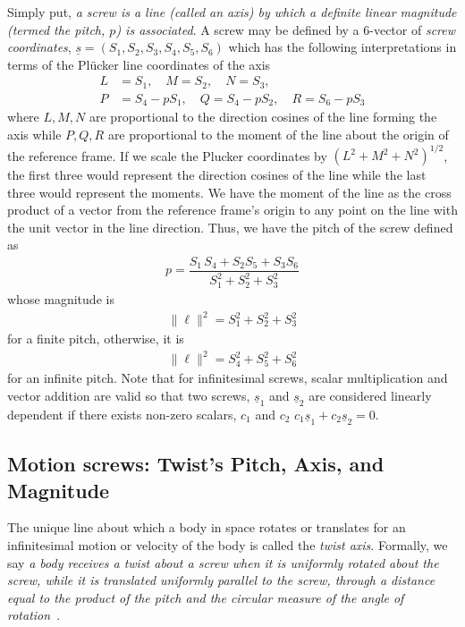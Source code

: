 Simply put, \textit{a screw is a line (called an axis) by which a definite linear magnitude (termed the pitch, $p$) is associated}.
A screw may be defined by a 6-vector of \textit{screw coordinates}, $\underline{s}=(S_1, S_2, S_3,S_4, S_5, S_6)$ which has the following interpretations in terms of the Pl\"ucker line coordinates of the axis
%
\begin{subequations}
	\begin{align}
	L &= S_1, \quad M = S_2, \quad N=S_3,   \label{eq:plucker_line} \\ 
	P &= S_4 - pS_1, \quad Q = S_4 - pS_2, \quad R = S_6 - pS_3
	\label{eq:plucker_mom}
	\end{align}
\end{subequations}
%
where $L, M, N$ are proportional to the direction cosines of the line forming the axis while $P, Q, R$ are proportional to the moment of the line about the origin of the reference frame. If we scale the Plucker coordinates by $(L^2 + M^2 + N^2)^{1/2}$, the first three would represent the direction cosines of the line while the last three would represent the moments. We have the moment of the line as the cross product of a vector from the reference frame's origin to any point on the line with the unit vector in the line direction. Thus, we have the pitch of the screw defined as 
%
\begin{align}
	p = \dfrac{S_1\,S_4+S_2S_5+S_3S_6}{S_1^2+S_2^2+S_3^2}
\end{align}
%
whose magnitude is 
%
\begin{align}
	\|\ell \|^2 = S_1^2+S_2^2+S_3^2
\end{align}
%
for a finite pitch, otherwise, it is
%
\begin{align}
\|\ell \|^2 = S_4^2+S_5^2+S_6^2
\end{align}
%
for an infinite pitch. Note that  for infinitesimal screws, scalar multiplication and vector addition are valid so that two screws, $\underline{s}_1$ and $\underline{s}_2$ are considered linearly dependent if there exists non-zero scalars, $c_1$ and $c_2$ \ie $c_1\underline{s}_1+c_2\underline{s}_2=0$.


\subsection{Motion screws: Twist's Pitch, Axis, and Magnitude}
%
The unique line about which a body in space rotates or translates for an infinitesimal motion or velocity of the body is called the \textit{twist axis}. Formally, we say \textit{a body receives a twist about a screw when it is uniformly rotated about the screw, while it is translated uniformly parallel to the screw, through a distance equal to the product of the pitch and the circular measure of the angle of rotation}~\cite{Ball}. 

